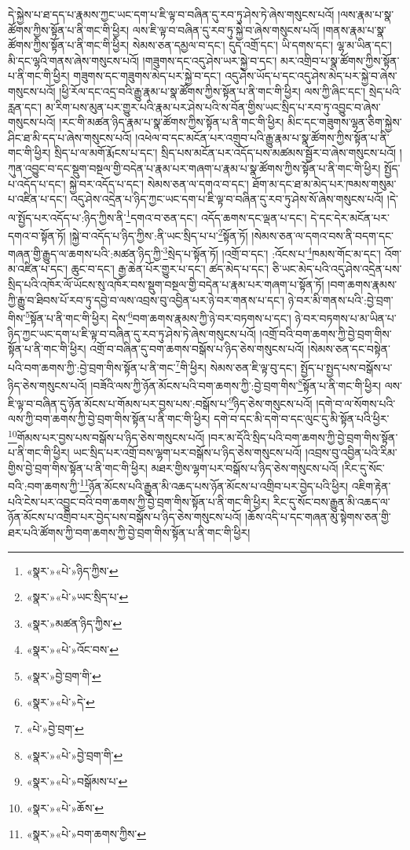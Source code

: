 དེ་སྐྱེས་པ་ཐ་དད་པ་རྣམས་ཀྱང་ཡང་དག་པ་ཇི་ལྟ་བ་བཞིན་དུ་རབ་ཏུ་ཤེས་ཏེ་ཞེས་གསུངས་པའོ། །ལས་རྣམ་པ་སྣ་ཚོགས་ཀྱིས་སྟོན་པ་ནི་གང་གི་ཕྱིར། ལས་ཇི་ལྟ་བ་བཞིན་དུ་རབ་ཏུ་སྐྱེ་བ་ཞེས་གསུངས་པའོ། །གནས་རྣམ་པ་སྣ་ཚོགས་ཀྱིས་སྟོན་པ་ནི་གང་གི་ཕྱིར། སེམས་ཅན་དམྱལ་བ་དང་། དུད་འགྲོ་དང་། ཡི་དགས་དང་། ལྷ་མ་ཡིན་དང་། མི་དང་ལྷའི་གནས་ཞེས་གསུངས་པའོ། །གཟུགས་དང་འདུ་ཤེས་ཡར་སྐྱེ་བ་དང་། མར་འགྲིབ་པ་སྣ་ཚོགས་ཀྱིས་སྟོན་པ་ནི་གང་གི་ཕྱིར། གཟུགས་དང་གཟུགས་མེད་པར་སྐྱེ་བ་དང་། འདུ་ཤེས་ཡོད་པ་དང་འདུ་ཤེས་མེད་པར་སྐྱེ་བ་ཞེས་གསུངས་པའོ། །ཕྱི་རོལ་དང་འདྲ་བའི་རྒྱུ་རྣམ་པ་སྣ་ཚོགས་ཀྱིས་སྟོན་པ་ནི་གང་གི་ཕྱིར། ལས་ཀྱི་ཞིང་དང་། སྲེད་པའི་རླན་དང་། མ་རིག་པས་མུན་པར་གྱུར་པའི་རྣམ་པར་ཤེས་པའི་ས་བོན་གྱིས་ཡང་སྲིད་པ་རབ་ཏུ་འབྱུང་བ་ཞེས་གསུངས་པའོ། །རང་གི་མཚན་ཉིད་རྣམ་པ་སྣ་ཚོགས་ཀྱིས་སྟོན་པ་ནི་གང་གི་ཕྱིར། མིང་དང་གཟུགས་ལྷན་ཅིག་སྐྱེས་ཤིང་ཐ་མི་དད་པ་ཞེས་གསུངས་པའོ། །འཕེལ་བ་དང་མངོན་པར་འགྲུབ་པའི་རྒྱུ་རྣམ་པ་སྣ་ཚོགས་ཀྱིས་སྟོན་པ་ནི་གང་གི་ཕྱིར། སྲིད་པ་ལ་མགོ་རྨོངས་པ་དང་། སྲིད་པས་མངོན་པར་འདོད་པས་མཚམས་སྦྱོར་བ་ཞེས་གསུངས་པའོ། །ཀུན་འབྱུང་བ་དང་སྡུག་བསྔལ་གྱི་བདེན་པ་རྣམ་པར་གཞག་པ་རྣམ་པ་སྣ་ཚོགས་ཀྱིས་སྟོན་པ་ནི་གང་གི་ཕྱིར། སྤྱོད་པ་འདོད་པ་དང་། སྐྱེ་བར་འདོད་པ་དང་། སེམས་ཅན་ལ་དགའ་བ་དང་། ཐོག་མ་དང་ཐ་མ་མེད་པར་ཁམས་གསུམ་པ་འཛིན་པ་དང་། འདུ་ཤེས་འདྲེན་པ་ཉིད་ཀྱང་ཡང་དག་པ་ཇི་ལྟ་བ་བཞིན་དུ་རབ་ཏུ་ཤེས་སོ་ཞེས་གསུངས་པའོ། །དེ་ལ་སྤྱོད་པར་འདོད་པ་:ཉིད་ཀྱིས་ནི་\footnote{«སྣར་»«པེ་»ཉིད་ཀྱིས་}དགའ་བ་ཅན་དང་། འདོད་ཆགས་དང་ལྡན་པ་དང་། དེ་དང་དེར་མངོན་པར་དགའ་བ་སྟོན་ཏོ། །སྐྱེ་བ་འདོད་པ་ཉིད་ཀྱིས་:ནི་ཡང་སྲིད་པ་པ་\footnote{«སྣར་»«པེ་»ཡང་སྲིད་པ་}སྟོན་ཏོ། །སེམས་ཅན་ལ་དགའ་བས་ནི་བདག་དང་གཞན་གྱི་རྒྱུད་ལ་ཆགས་པའི་:མཚན་ཉིད་ཀྱི་\footnote{«སྣར་»མཚན་ཉིད་ཀྱིས་}སྲེད་པ་སྟོན་ཏོ། །འགྲོ་བ་དང་། :འོངས་པ་\footnote{«སྣར་»«པེ་»འོང་བས་}ཁམས་གོང་མ་དང་། འོག་མ་འཛིན་པ་དང་། ཆུང་བ་དང་། རྒྱ་ཆེན་པོར་གྱུར་པ་དང་། ཚད་མེད་པ་དང་། ཅི་ཡང་མེད་པའི་འདུ་ཤེས་འདྲེན་པས་སྲིད་པའི་འཁོར་ལོ་ཡོངས་སུ་འཁོར་བས་སྡུག་བསྔལ་གྱི་བདེན་པ་རྣམ་པར་གཞག་པ་སྟོན་ཏོ། །བག་ཆགས་རྣམས་ཀྱི་རྒྱུ་བ་ཐིབས་པོ་རབ་ཏུ་དབྱེ་བ་ལས་འབྲས་བུ་འབྱིན་པར་ཉེ་བར་གནས་པ་དང་། ཉེ་བར་མི་གནས་པའི་:བྱེ་བྲག་གིས་\footnote{«སྣར་»བྱེ་བྲག་གི་}སྟོན་པ་ནི་གང་གི་ཕྱིར། དེས་\footnote{«སྣར་»«པེ་»དེ་}བག་ཆགས་རྣམས་ཀྱི་ཉེ་བར་བཏགས་པ་དང་། ཉེ་བར་བཏགས་པ་མ་ཡིན་པ་ཉིད་ཀྱང་ཡང་དག་པ་ཇི་ལྟ་བ་བཞིན་དུ་རབ་ཏུ་ཤེས་ཏེ་ཞེས་གསུངས་པའོ། །འགྲོ་བའི་བག་ཆགས་ཀྱི་བྱེ་བྲག་གིས་སྟོན་པ་ནི་གང་གི་ཕྱིར། འགྲོ་བ་བཞིན་དུ་བག་ཆགས་བསྒོས་པ་ཉིད་ཅེས་གསུངས་པའོ། །སེམས་ཅན་དང་བསྟེན་པའི་བག་ཆགས་ཀྱི་:བྱེ་བྲག་གིས་སྟོན་པ་ནི་གང་\footnote{«པེ་»བྱེ་བྲག་}གི་ཕྱིར། སེམས་ཅན་ཇི་ལྟ་བུ་དང་། སྤྱོད་པ་སྤྱད་པས་བསྒོས་པ་ཉིད་ཅེས་གསུངས་པའོ། །བཟོའི་ལས་ཀྱི་ཉོན་མོངས་པའི་བག་ཆགས་ཀྱི་:བྱེ་བྲག་གིས་\footnote{«སྣར་»«པེ་»བྱེ་བྲག་གི་}སྟོན་པ་ནི་གང་གི་ཕྱིར། ལས་ཇི་ལྟ་བ་བཞིན་དུ་ཉོན་མོངས་པ་གོམས་པར་བྱས་པས་:བསྒོས་པ་\footnote{«སྣར་»«པེ་»བསྒོམས་པ་}ཉིད་ཅེས་གསུངས་པའོ། །དགེ་བ་ལ་སོགས་པའི་ལས་ཀྱི་བག་ཆགས་ཀྱི་བྱེ་བྲག་གིས་སྟོན་པ་ནི་གང་གི་ཕྱིར། དགེ་བ་དང་མི་དགེ་བ་དང་ལུང་དུ་མི་སྟོན་པའི་ཕྱིར་\footnote{«སྣར་»«པེ་»ཆོས་}གོམས་པར་བྱས་པས་བསྒོས་པ་ཉིད་ཅེས་གསུངས་པའོ། །བར་མ་དོའི་སྲིད་པའི་བག་ཆགས་ཀྱི་བྱེ་བྲག་གིས་སྟོན་པ་ནི་གང་གི་ཕྱིར། ཡང་སྲིད་པར་འགྲོ་བས་ལྷག་པར་བསྒོས་པ་ཉིད་ཅེས་གསུངས་པའོ། །འབྲས་བུ་འབྱིན་པའི་རིམ་གྱིས་བྱེ་བྲག་གིས་སྟོན་པ་ནི་གང་གི་ཕྱིར། མཐར་གྱིས་ལྷག་པར་བསྒོས་པ་ཉིད་ཅེས་གསུངས་པའོ། །རིང་དུ་སོང་བའི་:བག་ཆགས་ཀྱི་\footnote{«སྣར་»«པེ་»བག་ཆགས་ཀྱིས་}ཉོན་མོངས་པའི་རྒྱུན་མི་འཆད་པས་ཉོན་མོངས་པ་འགྲིབ་པར་བྱེད་པའི་ཕྱིར། འཇིག་རྟེན་པའི་ངེས་པར་འབྱུང་བའི་བག་ཆགས་ཀྱི་བྱེ་བྲག་གིས་སྟོན་པ་ནི་གང་གི་ཕྱིར། རིང་དུ་སོང་བས་རྒྱུན་མི་འཆད་ལ་ཉོན་མོངས་པ་འགྲིབ་པར་བྱེད་པས་བསྒོས་པ་ཉིད་ཅེས་གསུངས་པའོ། །ཆོས་འདི་པ་དང་གཞན་མུ་སྟེགས་ཅན་གྱི་ཐར་པའི་ཚོགས་ཀྱི་བག་ཆགས་ཀྱི་བྱེ་བྲག་གིས་སྟོན་པ་ནི་གང་གི་ཕྱིར། 